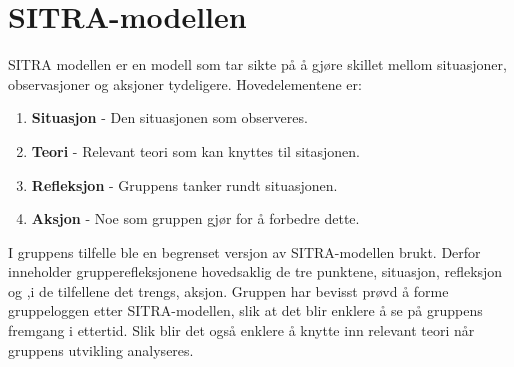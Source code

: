 \section{SITRA-modellen}
SITRA modellen er en modell som tar sikte på å gjøre skillet mellom situasjoner, observasjoner og aksjoner tydeligere.
Hovedelementene er:

\begin{enumerate}
  \item \textbf{Situasjon} - Den situasjonen som observeres.
  \item \textbf{Teori} - Relevant teori som kan knyttes til sitasjonen.
  \item \textbf{Refleksjon} - Gruppens tanker rundt situasjonen.
  \item \textbf{Aksjon} - Noe som gruppen gjør for å forbedre dette. 
\end{enumerate}

I gruppens tilfelle ble en begrenset versjon av SITRA-modellen brukt. 
Derfor inneholder grupperefleksjonene hovedsaklig de tre punktene, situasjon, refleksjon og ,i de tilfellene det trengs, aksjon.
Gruppen har bevisst prøvd å forme gruppeloggen etter SITRA-modellen, slik at det blir enklere å se på gruppens fremgang i ettertid. 
Slik blir det også enklere å knytte inn relevant teori når gruppens utvikling analyseres. 